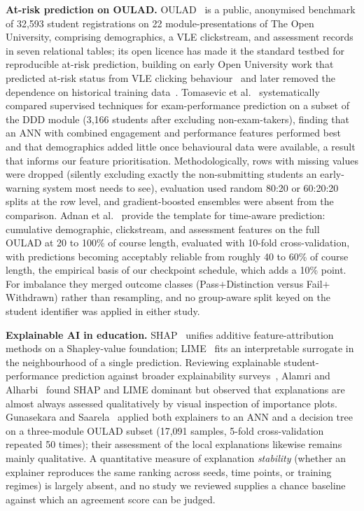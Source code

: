 \documentclass[conference]{IEEEtran}
\begin{document}
\textbf{At-risk prediction on OULAD.}
OULAD~\cite{kuzilek2017} is a public, anonymised benchmark of 32,593
student registrations on 22 module-presentations of The Open University,
comprising demographics, a VLE clickstream, and assessment records in seven
relational tables; its open licence has made it the standard testbed for
reproducible at-risk prediction, building on early Open University work that
predicted at-risk status from VLE clicking behaviour~\cite{wolff2013} and
later removed the dependence on historical training data~\cite{hlosta2017}.
Tomasevic et
al.~\cite{tomasevic2020} systematically compared supervised techniques for
exam-performance prediction on a subset of the DDD module (3,166 students
after excluding non-exam-takers), finding that an ANN with combined
engagement and performance features performed best and that demographics
added little once behavioural data were available, a result that informs
our feature prioritisation. Methodologically, rows with missing values were
dropped (silently excluding exactly the non-submitting students an
early-warning system most needs to see), evaluation used random 80:20 or
60:20:20 splits at the row level, and gradient-boosted ensembles were
absent from the comparison. Adnan et al.~\cite{adnan2021} provide the
template for time-aware prediction: cumulative demographic, clickstream, and
assessment features on the full OULAD at 20 to 100\% of course length,
evaluated with 10-fold cross-validation, with predictions becoming
acceptably reliable from roughly 40 to 60\% of course length, the empirical
basis of our checkpoint schedule, which adds a 10\% point. For imbalance
they merged outcome classes (Pass$+$Distinction versus Fail$+$Withdrawn)
rather than resampling, and no group-aware split keyed on the student
identifier was applied in either study.

\textbf{Explainable AI in education.}
SHAP~\cite{lundberg2017} unifies additive feature-attribution methods on a
Shapley-value foundation; LIME~\cite{ribeiro2016} fits an interpretable
surrogate in the neighbourhood of a single prediction. Reviewing explainable
student-performance prediction against broader explainability
surveys~\cite{guidotti2018,adadi2018,molnar2022}, Alamri and
Alharbi~\cite{alamri2021} found
SHAP and LIME dominant but observed that explanations are almost always
assessed qualitatively by visual inspection of importance plots. Gunasekara
and Saarela~\cite{gunasekara2025} applied both explainers to an ANN and a
decision tree on a three-module OULAD subset (17,091 samples, 5-fold
cross-validation repeated 50 times); their assessment of the local
explanations likewise remains mainly qualitative. A quantitative measure of
explanation \emph{stability} (whether an explainer reproduces the same
ranking across seeds, time points, or training regimes) is largely absent,
and no study we reviewed supplies a chance baseline against which an
agreement score can be judged.
\end{document}
